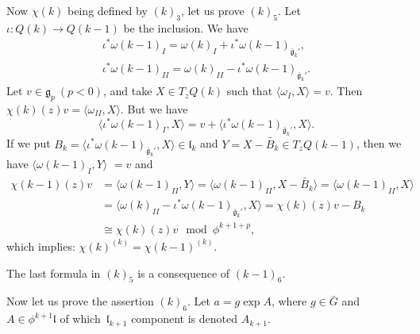 \documentclass[pdftex]{sigma}%
\newcommand{\gebar}{\bar{\mathfrak g}}
\newcommand{\g}{\mathfrak g}
\newcommand{\lf}{\mathfrak l}
\numberwithin{equation}{section}
\begin{document}
Now $\chi(k)$ being defined by $(k)_3$, let us prove $(k)_5$.
Let $\iota\colon Q(k) \to Q(k-1)$ be the inclusion. We have
\begin{gather*}
	\iota^* \omega(k-1)_I = \omega(k) _I + \iota ^* \omega(k-1) _{\gebar_k '}, \\
	\iota^* \omega(k-1)_{II} = \omega(k) _{II} - \iota ^* \omega(k-1) _{\gebar_k '}.
\end{gather*}
Let $v \in \g_p \ ( p < 0 ) $, and take $X \in T_zQ(k)$ such that
$ \langle \omega_I , X \rangle = v $.
Then $\chi(k) (z) v = \langle \omega_{II} , X\rangle$.
But we have
\[
\big\langle \iota^* \omega(k-1)_I, X \big\rangle = v + \big\langle \iota ^* \omega(k-1) _{\gebar_k '} , X\big\rangle.
\]
If we put
$B_k = \langle \iota ^* \omega(k-1) _{\gebar_k '} , X\rangle \in \lf_k$
and $ Y= X - \tilde{B_k} \in T_zQ(k-1)$, then we have
$\langle \omega(k-1)_I, Y\rangle$ $= v $ and
\begin{align*}
\chi(k-1)(z) v &=\big\langle \omega(k-1) _{II} , Y \big\rangle
= \big\langle \omega(k-1) _{II} , X - \tilde{B_k} \big\rangle
= \big\langle \omega(k-1) _{II} , X \big\rangle
\\
& = \big\langle \omega(k) _{II} - \iota ^* \omega(k-1) _{\gebar_k '} , X\big\rangle
= \chi(k)(z)v - B_k \\
&\cong \chi(k)(z)v \mod \phi^{k+1+p },
\end{align*}
which implies: $ \chi(k) ^{(k)} = \chi(k-1)^{(k)}$.

The last formula in $(k)_5$ is a consequence of $(k-1)_6$.

Now let us prove the assertion $(k)_6$.
Let $ a = g\exp A $, where $g \in \bar{G} $ and
$A \in \phi^{k+1} \lf$ of which~$\lf_{k+1}$ component
is denoted $A_{k+1}$.
\end{document}
